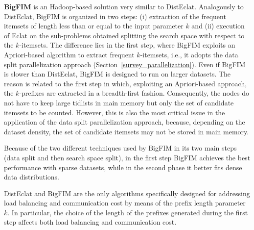 {\bf BigFIM} is an Hadoop-based solution very similar to DistEclat. 
Analogously to DistEclat, BigFIM is organized in two steps: (i) extraction of the frequent itemsets 
of length less than or equal to the input parameter $k$ and (ii) execution of Eclat on the sub-problems obtained splitting the search space with respect 
to the $k$-itemsets. The difference lies in the first step, where BigFIM exploits an Apriori-based algorithm to extract frequent $k$-itemsets, i.e., it adopts the data split parallelization approach (Section~\ref{survey_parallelization}). 
Even if BigFIM is slower than DistEclat, BigFIM is designed to run on larger datasets.
The reason is related to the first step in which, exploiting an Apriori-based approach,
the $k$-prefixes are extracted in a breadth-first fashion.  Consequently, the nodes do not have to keep large tidlists in main memory but only the set of candidate itemsets to be counted. However, this is also the most critical issue in the application of the data split parallelization approach, because, depending on the dataset density, the set of candidate itemsets may not be stored in main memory. 

Because of the two different techniques used by BigFIM in its two main steps (data split and then search space split), 
in the first step BigFIM achieves the best performance with sparse datasets, while in the second phase it better fits dense data distributions.

DistEclat and BigFIM are the only algorithms specifically designed for addressing 
load balancing and communication cost by means of the prefix length parameter $k$. 
In particular, the choice of the length of the prefixes
generated during the first step affects both load
balancing and communication cost. 




